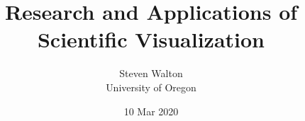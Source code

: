\documentclass[pdf,11pt]{beamer}
\title{Research and Applications of Scientific Visualization
}
\author{Steven Walton\\ \small University of Oregon}
\date{10 Mar 2020}
\begin{document}
\frame{\titlepage}





\end{document}
